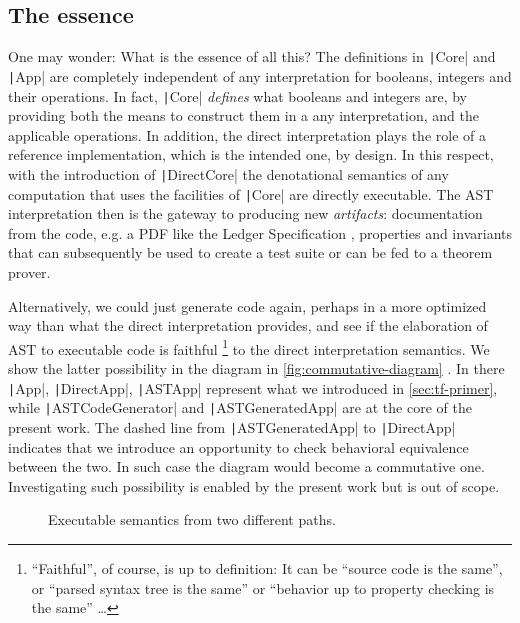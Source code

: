 \documentclass[11pt]{article}
\renewcommand{\vref}[1]{\autoref{#1} \vpageref{#1}}{}
\newcommand{\Scala}[1]{\texttt|#1|}
\newcommand{\ScalaI}[1]{\texttt|#1|}
\newcommand{\TextI}[1]{\texttt|#1|}
\begin{document}
\subsection{The essence}
One may wonder: What is the essence of all this? The definitions in \ScalaI{Core} and \Scala{App} are completely independent of any interpretation for booleans, integers and their operations. In fact, \ScalaI{Core} \textit{defines} what booleans and integers are, by providing both the means to construct them in a any interpretation, and the applicable operations. In addition, the direct interpretation plays the role of a reference implementation, which is the intended one, by design. In this respect, with the introduction of \ScalaI{DirectCore} the denotational semantics of any computation that uses the facilities of \ScalaI{Core} are directly executable. The AST interpretation then is the gateway to producing new \textit{artifacts}: documentation from the code, e.g. a PDF like the Ledger Specification \cite{cardano:ledger-spec:shelley:2019}, properties and invariants that can subsequently be used to create a test suite or can be fed to a theorem prover. 

Alternatively, we could just generate code again, perhaps in a more optimized way than what the direct interpretation provides, and see if the elaboration of AST to executable code is faithful%
\footnote{``Faithful'', of course, is up to definition: It can be ``source code is the same'', or ``parsed syntax tree is the same'' or ``behavior up to property checking is the same'' \dots}
to the direct interpretation semantics. We show the latter possibility in the diagram in \vref{fig:commutative-diagram}. In there \ScalaI{App}, \ScalaI{DirectApp}, \ScalaI{ASTApp} represent what we introduced in \autoref{sec:tf-primer}, while \TextI{ASTCodeGenerator} and \TextI{ASTGeneratedApp} are at the core of the present work. The dashed line from \TextI{ASTGeneratedApp} to \TextI{DirectApp} indicates that we introduce an opportunity to check behavioral equivalence between the two. In such case the diagram would become a commutative one. Investigating such possibility is enabled by the present work but is out of scope.

\begin{figure}
\begin{center}
\end{center}
\caption{Executable semantics from two different paths.}
\label{fig:commutative-diagram}
\hrulefill
\end{figure}
\end{document}
